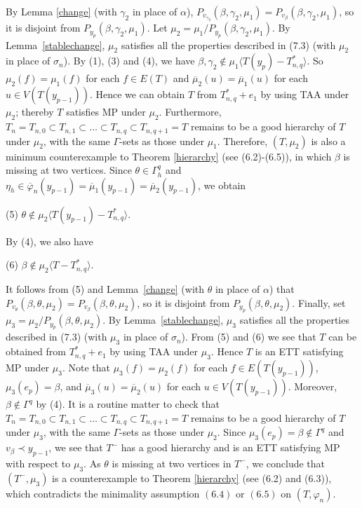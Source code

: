 \documentclass[11pt]{article}
\begin{document}
\noindent By Lemma \ref{change} (with $\gamma_2$ in place of $\alpha$), $P_{v_{\gamma_{2}}}(\beta, \gamma_{2},\mu_1)=P_{v_{\beta}}(\beta, \gamma_{2}, \mu_1)$, so it is disjoint from $P_{y_{p}}(\beta, \gamma_{2},\mu_1)$. 
Let $\mu_2=\mu_1/P_{y_{p}}(\beta,\gamma_{2}, \mu_1)$.  By Lemma~\ref{stablechange},  $\mu_2$ satisfies all the properties 
described in (7.3) (with $\mu_2$ in place of $\sigma_n$). By (1), (3) and (4), we have $\beta, \gamma_2 \notin \mu_1 \langle T(y_{p})-T_{n,q}^* \rangle$. So $\mu_2(f)=\mu_1(f)$ for each $f\in E(T)$ and $\overline{\mu}_2(u)=\overline{\mu}_1(u)$ 
for each $u\in V(T(y_{p-1}))$. Hence we can obtain $T$ from $T_{n,q}^*+e_1$ by using TAA under $\mu_2$; thereby $T$ satisfies 
MP under $\mu_2$. Furthermore, $T_n=T_{n,0} \subset T_{n,1} \subset \ldots \subset T_{n,q} \subset T_{n,q+1}=T$ remains to 
be a good hierarchy of $T$ under $\mu_2$, with the same $\Gamma$-sets as those under $\mu_1$.
Therefore, $(T, \mu_2)$ is also a minimum counterexample to Theorem \ref{hierarchy} 
(see (6.2)-(6.5)), in which $\beta$ is missing at two vertices. Since $\theta\in \Gamma^{q}_h$ and $\eta_h\in \overline{\varphi}_n(y_{p-1})=\overline{\mu}_1(y_{p-1})=\overline{\mu}_2(y_{p-1})$, we obtain 

(5) $\theta \notin \mu_2 \langle T(y_{p-1}) - T_{n,q}^* \rangle$. 

\noindent By (4), we also have 

(6) $\beta \notin \mu_2 \langle T - T_{n,q}^* \rangle$. 

\noindent It follows from (5) and Lemma~\ref{change} (with $\theta$ in place of $\alpha$) that $P_{v_{\theta}}(\beta,\theta,\mu_2)=P_{v_{\beta}}(\beta, \theta,\mu_2)$, so it is disjoint from 
$P_{y_{p}}(\beta,\theta,\mu_2)$. Finally, set $\mu_3=\mu_2/P_{y_{p}}(\beta,\theta,
\mu_2)$. By Lemma~\ref{stablechange},  $\mu_3$ satisfies all the properties described in (7.3) (with $\mu_3$ in 
place of $\sigma_n$). From (5) and (6) we see that $T$ can be obtained from $T_{n,q}^*+e_1$ by using TAA under $\mu_3$. Hence 
$T$ is an ETT satisfying MP under $\mu_3$. Note that $\mu_3(f)=\mu_2(f)$ for each $f\in E(T(y_{p-1}))$,
$\mu_3(e_p)=\beta$, and $\overline{\mu}_3(u)=\overline{\mu}_2(u)$ for each $u\in V(T(y_{p-1}))$. Moreover, $\beta \notin 
\Gamma^q$ by (4). It is a routine matter to check that $T_n=T_{n,0} \subset T_{n,1} \subset \ldots \subset T_{n,q} \subset T_{n,q+1}=T$ remains to be a good hierarchy of $T$ under $\mu_3$, with the same $\Gamma$-sets as those under $\mu_2$. 
Since $\mu_3(e_p)=\beta \notin \Gamma^q$ and $v_{\beta} \prec y_{p-1}$,  we see that 
$T^-$ has a good hierarchy and is an ETT satisfying MP with respect to $\mu_3$. As $\theta$ is missing at two vertices
in $T^-$, we conclude that $(T^-, \mu_3)$ is a counterexample to Theorem \ref{hierarchy} (see (6.2) and (6.3)), 
which contradicts the minimality assumption $(6.4)$ or $(6.5)$ on  $(T, \varphi_n)$.
\end{document}
